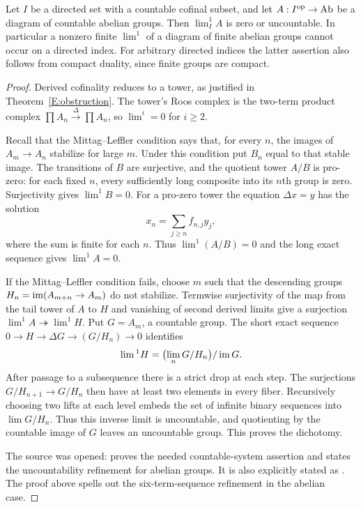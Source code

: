 \begin{theorem}\label{E:gray}
Let $I$ be a directed set with a countable cofinal subset, and let $A:I^{\mathrm{op}}\to\mathrm{Ab}$ be a diagram of countable abelian groups. Then $\lim^1_I A$ is zero or uncountable. In particular a nonzero finite $\lim^1$ of a diagram of finite abelian groups cannot occur on a directed index. For arbitrary directed indices the latter assertion also follows from compact duality, since finite groups are compact.
\end{theorem}
\begin{proof}
Derived cofinality reduces to a tower, as justified in Theorem~\ref{E:obstruction}. The tower's Roos complex is the two-term product complex $\prod A_n\xrightarrow{\Delta}\prod A_n$, so $\lim^i=0$ for $i\geq2$.

Recall that the Mittag--Leffler condition says that, for every $n$, the images of $A_m\to A_n$ stabilize for large $m$. Under this condition put $B_n$ equal to that stable image. The transitions of $B$ are surjective, and the quotient tower $A/B$ is pro-zero: for each fixed $n$, every sufficiently long composite into its $n$th group is zero. Surjectivity gives $\lim^1B=0$. For a pro-zero tower the equation $\Delta x=y$ has the solution
\[
 x_n=\sum_{j\geq n}f_{n,j}y_j,
\]
where the sum is finite for each $n$. Thus $\lim^1(A/B)=0$ and the long exact sequence gives $\lim^1A=0$.

If the Mittag--Leffler condition fails, choose $m$ such that the descending groups $H_n=\operatorname{im}(A_{m+n}\to A_m)$ do not stabilize. Termwise surjectivity of the map from the tail tower of $A$ to $H$ and vanishing of second derived limits give a surjection $\lim^1A\twoheadrightarrow\lim^1H$. Put $G=A_m$, a countable group. The short exact sequence $0\to H\to\Delta G\to(G/H_n)\to0$ identifies
\[
 \lim{}^1H=\bigl(\lim_nG/H_n\bigr)/\operatorname{im} G.
\]
After passage to a subsequence there is a strict drop at each step. The surjections $G/H_{n+1}\to G/H_n$ then have at least two elements in every fiber. Recursively choosing two lifts at each level embeds the set of infinite binary sequences into $\lim G/H_n$. Thus this inverse limit is uncountable, and quotienting by the countable image of $G$ leaves an uncountable group. This proves the dichotomy.

The source was opened: \citet[p.~242, unnumbered Proposition and the parenthetical refinement following its proof]{Gray1966} proves the needed countable-system assertion and states the uncountability refinement for abelian groups. It is also explicitly stated as \citet[Proposition 3.5]{Schochet2003}. The proof above spells out the six-term-sequence refinement in the abelian case.
\end{proof}
